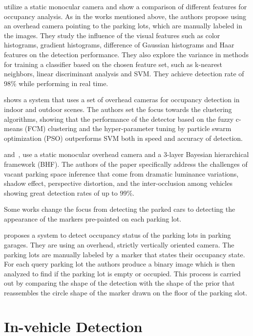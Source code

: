 \citet{tschentscher} utilize a static monocular camera and show a comparison
of different features for occupancy analysis. As in the works mentioned above,
the authors propose using an overhead camera pointing to the parking lots,
which are manually labeled in the images. They study the influence of the
visual features such as color histograms, gradient histograms, difference of
Gaussian histograms and Haar features on the detection performance. They also
explore the variance in methods for training a classifier based on the chosen
feature set, such as k-nearest neighbors, linear discriminant analysis and
SVM\@. They achieve detection rate of 98\% while performing in real time.

\citet{ichihashi} shows a system that uses a set of overhead cameras for
occupancy detection in indoor and outdoor scenes. The authors set the focus
towards the clustering algorithms, showing that the performance of the
detector based on the fuzzy c-means (FCM) clustering and the hyper-parameter
tuning by particle swarm optimization (PSO) outperforms SVM both in speed and
accuracy of detection.

\citet{chingchun10} and~\citet{chingjao10}, use a static monocular overhead
camera and a 3-layer Bayesian hierarchical framework (BHF). The authors of the
paper specifically address the challenges of vacant parking space inference
that come from dramatic luminance variations, shadow effect, perspective
distortion, and the inter-occlusion among vehicles showing great detection
rates of up to 99\%.

Some works change the focus from detecting the parked cars to detecting the
appearance of the markers pre-painted on each parking lot.

\citet{yusnita12} proposes a system to detect occupancy status of the parking
lots in parking garages. They are using an overhead, strictly vertically
oriented camera. The parking lots are manually labeled by a marker that states
their occupancy state. For each query parking lot the authors produce a binary
image which is then analyzed to find if the parking lot is empty or occupied.
This process is carried out by comparing the shape of the detection with the
shape of the prior that reassembles the circle shape of the marker drawn on
the floor of the parking slot.


\section{In-vehicle Detection} %
\label{sec:in_vehicle_detection}


